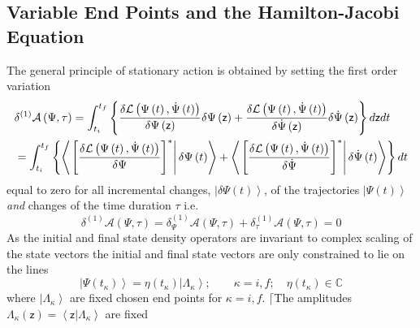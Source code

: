 \documentclass[aps,preprint]{revtex4}
\begin{document}
\subsection{Variable End Points and the Hamilton-Jacobi Equation}

The general principle of stationary action is obtained by setting the first
order variation 
\begin{align}
& \delta^{\left( 1\right) }\mathcal{A}\left( \Psi,\tau\right) =\int
_{t_{i}}^{t_{f}}\left\{ \frac{\delta\mathcal{L}\left( \Psi\left( t\right) ,%
\dot{\Psi}\left( t\right) \right) }{\delta\Psi\left( \mathsf{z}\right) }%
\delta\Psi\left( \mathsf{z}\right) +\frac{\delta\mathcal{L}\left( \Psi\left(
t\right) ,\dot{\Psi}\left( t\right) \right) }{\delta\dot{\Psi }\left( 
\mathsf{z}\right) }\delta\dot{\Psi}\left( \mathsf{z}\right) \right\} d%
\mathsf{z}dt  \notag \\
& =\int_{t_{i}}^{t_{f}}\left\{ \left\langle \left. \left[ \frac {\delta%
\mathcal{L}\left( \Psi\left( t\right) ,\dot{\Psi}\left( t\right) \right) }{%
\delta\Psi}\right] ^{\ast}\right| \delta\Psi\left( t\right) \right\rangle
+\left\langle \left. \left[ \frac{\delta\mathcal{L}\left( \Psi\left(
t\right) ,\dot{\Psi}\left( t\right) \right) }{\delta\dot{\Psi }}\right]
^{\ast}\right| \delta\dot{\Psi}\left( t\right) \right\rangle \right\} dt
\end{align}
equal to zero for all incremental changes, $\left| \delta\Psi\left( t\right)
\right\rangle $, of the trajectories $\left| \Psi\left( t\right)
\right\rangle $ \emph{and }changes of the time duration $\tau$ i.e. 
\begin{equation}
\delta^{\left( 1\right) }\mathcal{A}\left( \Psi,\tau\right) =\delta_{\Psi
}^{\left( 1\right) }\mathcal{A}\left( \Psi,\tau\right) +\delta_{\tau
}^{\left( 1\right) }\mathcal{A}\left( \Psi,\tau\right) =0
\end{equation}
As the initial and final state density operators are invariant to complex
scaling of the state vectors the initial and final state vectors are only
constrained to lie on the lines 
\begin{equation}
\left| \Psi\left( t_{\kappa}\right) \right\rangle =\eta\left( t_{\kappa
}\right) \left| \Lambda_{\kappa}\right\rangle ;\qquad\kappa=i,f;\quad
\eta\left( t_{\kappa}\right) \in\mathbb{C}  \label{const}
\end{equation}
where $\left| \Lambda_{\kappa}\right\rangle $ are fixed chosen end points
for $\kappa=i,f$. $\lceil$The amplitudes $\Lambda_{\kappa}\left( \mathsf{z}%
\right) =\left\langle \mathsf{z}|\Lambda_{\kappa}\right\rangle $ are fixed
\end{document}

